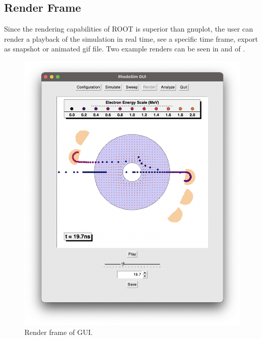 \documentclass[a4paper,oneside,12pt]{report}
\numberwithin{equation}{chapter}
\begin{document}
{\subsection{Render Frame}
Since the rendering capabilities of ROOT is superior than gnuplot, the user can render a playback of the simulation in real time, 
see a specific time frame, export as snapshot or animated gif file.
Two example renders can be seen in  and  of .
\vspace{10pt}
\begin{figure}[h]
    \centering
    \includegraphics[width=0.85\linewidth]{./figures/rhodoSim/GUI_render_frame_5.png}
    \vspace{-20pt}
    \caption{Render frame of GUI.}
    \label{fig:gui_render_1}
\end{figure}

}
\end{document}
